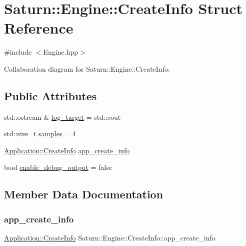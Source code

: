 \hypertarget{struct_saturn_1_1_engine_1_1_create_info}{}\section{Saturn\+:\+:Engine\+:\+:Create\+Info Struct Reference}
\label{struct_saturn_1_1_engine_1_1_create_info}


{\ttfamily \#include $<$Engine.\+hpp$>$}



Collaboration diagram for Saturn\+:\+:Engine\+:\+:Create\+Info\+:
\subsection*{Public Attributes}
\begin{DoxyCompactItemize}
\item 
std\+::ostream \& \mbox{\hyperlink{struct_saturn_1_1_engine_1_1_create_info_acf9e89bc5aa9f3f7c3c29c5aea37d425}{log\+\_\+target}} = std\+::cout
\item 
std\+::size\+\_\+t \mbox{\hyperlink{struct_saturn_1_1_engine_1_1_create_info_a22fa308424d1a00977b0bf809c75e642}{samples}} = 4
\item 
\mbox{\hyperlink{struct_saturn_1_1_application_1_1_create_info}{Application\+::\+Create\+Info}} \mbox{\hyperlink{struct_saturn_1_1_engine_1_1_create_info_a413aaa338d3df70f7e2bc2ff78db2c80}{app\+\_\+create\+\_\+info}}
\item 
bool \mbox{\hyperlink{struct_saturn_1_1_engine_1_1_create_info_a86d7f0286a43667f8ae5fdba3b5d5c58}{enable\+\_\+debug\+\_\+output}} = false
\end{DoxyCompactItemize}


\subsection{Member Data Documentation}
\mbox{\label{struct_saturn_1_1_engine_1_1_create_info_a413aaa338d3df70f7e2bc2ff78db2c80}} 
\subsubsection{\texorpdfstring{app\+\_\+create\+\_\+info}{app\_create\_info}}
{\footnotesize\ttfamily \mbox{\hyperlink{struct_saturn_1_1_application_1_1_create_info}{Application\+::\+Create\+Info}} Saturn\+::\+Engine\+::\+Create\+Info\+::app\+\_\+create\+\_\+info}

